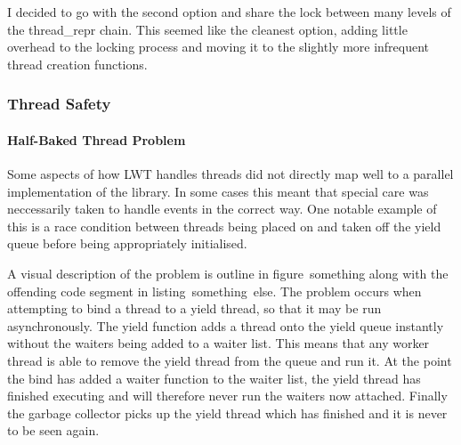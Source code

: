 \documentclass[12pt,twoside,notitlepage]{report}
\begin{document}
I decided to go with the second option and share the lock between many levels of the thread\_repr chain. This seemed like the cleanest option, adding little overhead to the locking process and moving it to the slightly more infrequent
thread creation functions.

%
%

%
%
\subsubsection{Thread Safety}
\label{subsec:thread_safety}
%
%

\paragraph{Half-Baked Thread Problem}
\label{para:half-baked_thread_problem}
%
%
Some aspects of how LWT handles threads did not directly map well to a parallel implementation of the library. In some cases this meant that special care was neccessarily taken to handle events in the correct way. One notable example
of this is a race condition between threads being placed on and taken off the yield queue before being appropriately initialised.

A visual description of the problem is outline in figure~something along with the offending code segment in listing~something~else. The
problem occurs when attempting to bind a thread to a yield thread, so that it may be run asynchronously. The yield function adds a thread onto the yield queue instantly without the waiters being added to a waiter list. This means that
any worker thread is able to remove the yield thread from the queue and run it. At the point the bind has added a waiter function to the waiter list, the yield thread has finished executing and will therefore never run the waiters now
attached. Finally the garbage collector picks up the yield thread which has finished and it is never to be seen again. 
\end{document}
